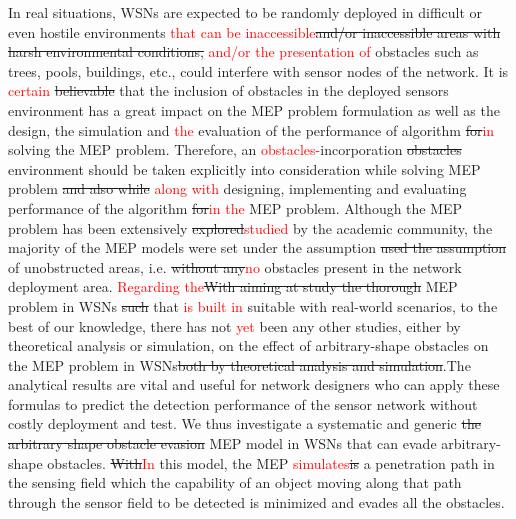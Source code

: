 \documentclass[final]{elsarticle}
\begin{document}
In real situations, WSNs are expected to be randomly deployed in difficult or even hostile environments \textcolor{red}{that can be inaccessible}\sout{and/or inaccessible areas with harsh environmental conditions,} \textcolor{red}{and/or the presentation of} obstacles such as trees, pools, buildings, etc., could interfere with sensor nodes of the network. It is \textcolor{red}{certain} \sout{believable} that the inclusion of obstacles in the deployed sensors environment has a great impact on the MEP problem formulation as well as the design, the simulation and \textcolor{red}{the} evaluation of the performance of algorithm \sout{for}\textcolor{red}{in} solving the MEP problem. Therefore, an \textcolor{red}{obstacles-}incorporation \sout{obstacles} environment should be taken explicitly into consideration while solving MEP problem \sout{and also while} \textcolor{red}{along with} designing, implementing and evaluating performance of the algorithm \sout{for}\textcolor{red}{in the} MEP problem. Although the MEP problem has been extensively \sout{explored}\textcolor{red}{studied} by the academic community, the majority of the MEP models were set under the assumption \sout{used the assumption} of unobstructed areas, i.e. \sout{without any}\textcolor{red}{no} obstacles present in the network deployment area. \textcolor{red}{Regarding the}\sout{With aiming at study the thorough} MEP problem in WSNs \sout{such} that \textcolor{red}{is built in} suitable with real-world scenarios, to the best of our knowledge, there has not \textcolor{red}{yet} been any other studies, either by theoretical analysis or simulation, on the effect of arbitrary-shape obstacles on the MEP problem in WSNs\sout{both by theoretical analysis and simulation}.The analytical results are vital and useful for network designers who can apply these formulas to predict the detection performance of the sensor network without costly deployment and test. We thus investigate a systematic and generic \sout{the arbitrary shape obstacle evasion} MEP model in WSNs that can evade arbitrary-shape obstacles. \sout{With}\textcolor{red}{In} this model, the MEP \textcolor{red}{simulates}\sout{is} a penetration path in the sensing field which the capability of an object moving along that path through the sensor field to be detected is minimized and evades all the obstacles. 
\end{document}
